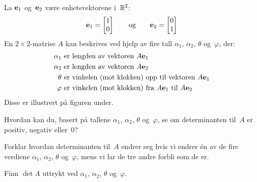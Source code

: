 \begin{oppgave}
La $\mathbf{e}_1$ og~$\mathbf{e}_2$ være enhetsvektorene i~$\mathbb{R}^2$:
\[
\mathbf{e}_1 = \begin{bmatrix} 1 \\ 0 \end{bmatrix}
\qquad\text{og}\qquad
\mathbf{e}_2 = \begin{bmatrix} 0 \\ 1 \end{bmatrix}
\]
En $2 \times 2$-matrise $A$ kan beskrives ved hjelp av fire tall
$\alpha_1$, $\alpha_2$, $\theta$ og~$\varphi$, der:
\begin{align*}
\alpha_1\ &\text{er lengden av vektoren $A \mathbf{e}_1$} \\
\alpha_2\ &\text{er lengden av vektoren $A \mathbf{e}_2$} \\
\theta  \ &\text{er vinkelen (mot klokken) opp til vektoren $A \mathbf{e}_1$} \\
\varphi \ &\text{er vinkelen (mot klokken) fra $A \mathbf{e}_1$ til $A \mathbf{e}_2$}
\end{align*}
Disse er illustrert på figuren under.
\begin{center}
\end{center}
\begin{punkt}
Hvordan kan du, basert på tallene $\alpha_1$, $\alpha_2$, $\theta$
og~$\varphi$, se om determinanten til~$A$ er positiv, negativ
eller~$0$?
\end{punkt}
\begin{punkt}
Forklar hvordan determinanten til~$A$ endrer seg hvis vi endrer én av
de fire verdiene $\alpha_1$, $\alpha_2$, $\theta$ og~$\varphi$, mens
vi lar de tre andre forbli som de er.
\end{punkt}
\begin{punkt}
Finn $\det A$ uttrykt ved $\alpha_1$, $\alpha_2$, $\theta$
og~$\varphi$.
\end{punkt}
\end{oppgave}

